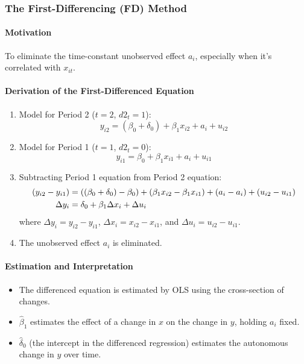 \documentclass[a4paper, 10pt]{article}
\theoremstyle{definition}	%
\begin{document}
\subsubsection{The First-Differencing (FD) Method}
\paragraph{Motivation}
To eliminate the time-constant unobserved effect \(a_i\), especially when it's correlated with \(x_{it}\).
\paragraph{Derivation of the First-Differenced Equation}
\begin{enumerate}
    \item Model for Period 2 (\(t=2\), \(d2_t=1\)):
    \[ y_{i2} = (\beta_0 + \delta_0) + \beta_1 x_{i2} + a_i + u_{i2} \]
    \item Model for Period 1 (\(t=1\), \(d2_t=0\)):
    \[ y_{i1} = \beta_0 + \beta_1 x_{i1} + a_i + u_{i1} \]
    \item Subtracting Period 1 equation from Period 2 equation:
    \begin{align}
    (y_{i2} - y_{i1}) &= ((\beta_0 + \delta_0) - \beta_0) + (\beta_1 x_{i2} - \beta_1 x_{i1}) + (a_i - a_i) + (u_{i2} - u_{i1}) \notag \\
    \Delta y_i &= \delta_0 + \beta_1 \Delta x_i + \Delta u_i \label{eq:13.24}
    \end{align}
    where \(\Delta y_i = y_{i2} - y_{i1}\), \(\Delta x_i = x_{i2} - x_{i1}\), and \(\Delta u_i = u_{i2} - u_{i1}\).
    \item The unobserved effect \(a_i\) is eliminated.
\end{enumerate}

\paragraph{Estimation and Interpretation}
\begin{itemize}
    \item The differenced equation is estimated by OLS using the cross-section of changes.
    \item \(\hat{\beta}_1\) estimates the effect of a change in \(x\) on the change in \(y\), holding \(a_i\) fixed.
    \item \(\hat{\delta}_0\) (the intercept in the differenced regression) estimates the autonomous change in \(y\) over time.
\end{itemize}
\end{document}
